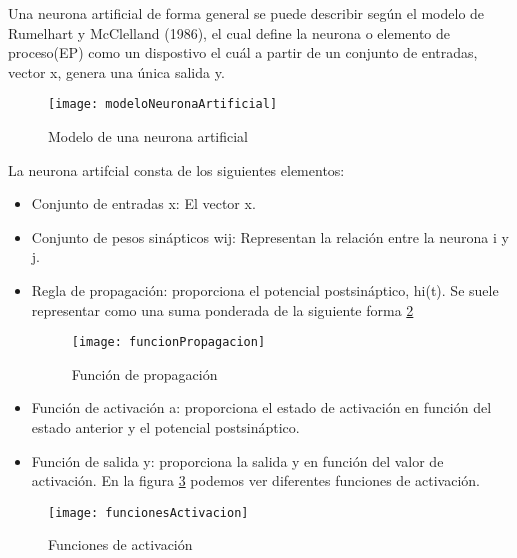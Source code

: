Una neurona artificial de forma general se puede describir según el modelo de Rumelhart y McClelland (1986), el cual define la neurona o elemento de proceso(EP) como un dispostivo el cuál a partir de un conjunto de entradas, vector x, genera una única salida y. \cite{redesNeurnalesUno}

\begin{figure}[h]
    \begin{center}%
        \begin{center}%
          \texttt{[image: modeloNeuronaArtificial]}%
          \caption{Modelo de una neurona artificial}%
          \label{figmodeloNeuronaArtificial}%
        \end{center}%
  	\end{center}%
\end{figure}%

\newpage
La neurona artifcial consta de los siguientes elementos:

\begin{itemize}
	\item{Conjunto de entradas x}: El vector x.
	\item{Conjunto de pesos sinápticos wij}: Representan la relación entre la neurona i y j.
	\item{Regla de propagación}: proporciona el potencial postsináptico, hi(t). Se suele representar como una suma ponderada de la siguiente forma \ref{figfuncionPropagacion}
	
\begin{figure}[h]
    \begin{center}%
        \begin{center}%
          \texttt{[image: funcionPropagacion]}%
          \caption{Función de propagación}%
          \label{figfuncionPropagacion}%
        \end{center}%
  	\end{center}%
\end{figure}%
	\item{Función de activación a}: proporciona el estado de activación en función del estado anterior y el potencial postsináptico.
	\item{Función de salida y}: proporciona la salida y en función del valor de activación. En la figura \ref{figfuncionesActivacion} podemos ver diferentes funciones de activación.
\end{itemize}

\begin{figure}[h]
    \begin{center}%
        \begin{center}%
          \texttt{[image: funcionesActivacion]}%
          \caption{Funciones de activación}%
          \label{figfuncionesActivacion}%
        \end{center}%
  	\end{center}%
\end{figure}%
\newpage

